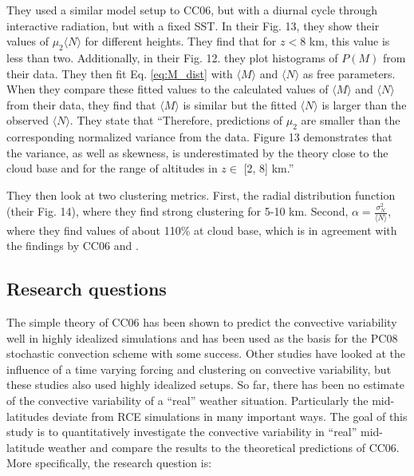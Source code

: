 \documentclass[a4paper, 12pt]{article}
\begin{document}
\subsubsection{\cite{Davoudi2010}}
They used a similar model setup to CC06, but with a diurnal cycle through interactive radiation, but with a fixed SST. In their Fig. 13, they show their values of $\mu_2 \langle N \rangle$ for different heights. They find that for $z <$8 km, this value is less than two. Additionally, in their Fig. 12. they plot histograms of $P(M)$ from their data. They then fit Eq. \ref{eq:M_dist} with $\langle M \rangle$ and $\langle N \rangle$ as free parameters. When they compare these fitted values to the calculated values of $\langle M \rangle$ and $\langle N \rangle$ from their data, they find that $\langle M \rangle$  is similar but the fitted $\langle N \rangle$ is larger than the observed $\langle N \rangle$. They state that ``Therefore, predictions of $\mu_2$ are smaller than the corresponding normalized variance from the data. Figure 13 demonstrates that the variance, as well as skewness, is underestimated by the theory close to the cloud base and for the range of altitudes in $z \in$  [2, 8] km.''

They then look at two clustering metrics. First, the radial distribution function (their Fig. 14), where they find strong clustering for 5-10 km. Second, $\alpha = \frac{\sigma_N^2}{\langle N \rangle}$, where they find values of about 110\% at cloud base, which is in agreement with the findings by CC06 and \cite{Davies2008}. 

\subsection{Research questions}
The simple theory of CC06 has been shown to predict the convective variability well in highly idealized simulations and has been used as the basis for the PC08 stochastic convection scheme with some success. Other studies have looked at the influence of a time varying forcing and clustering on convective variability, but these studies also used highly idealized setups. So far, there has been no estimate of the convective variability of a ``real'' weather situation. Particularly the mid-latitudes deviate from RCE simulations in many important ways. The goal of this study is to quantitatively investigate the convective variability in ``real'' mid-latitude weather and compare the results to the theoretical predictions of CC06. More specifically, the research question is:
\end{document}
